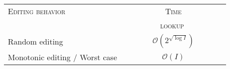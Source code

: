 
\begin{tabularx}{0.6\textwidth}{@{}Xc@{}}
  \toprule
  \textsc{Editing behavior} & \textsc{Time} \\
  & \ \ \ \ \ \ \ \ \ \textsc{lookup} \ \ \ \ \ \ \ \ \ \\ \midrule
  Random editing & $\mathcal{O}(2^{\sqrt{\log I}})$ \\
  Monotonic editing / Worst case & $\mathcal{O}(I)$ \\ \bottomrule
\end{tabularx}

